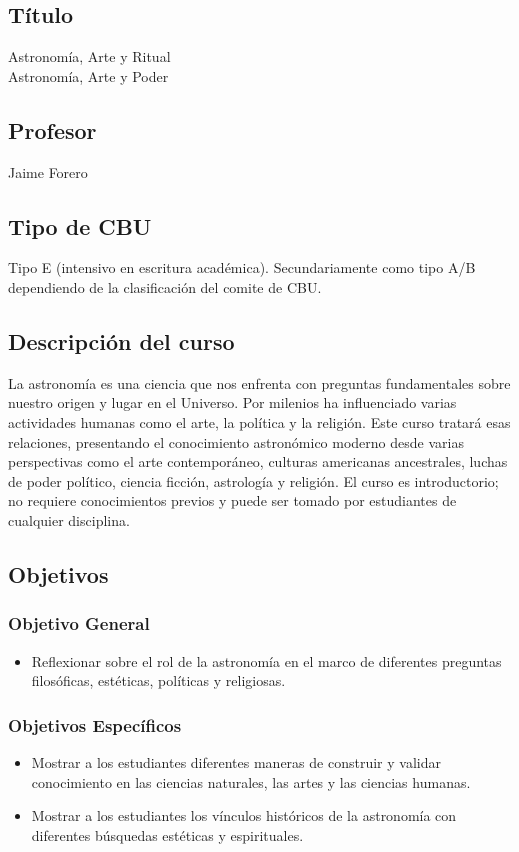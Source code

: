 \documentclass{report}
\begin{document}
\subsection*{\bf T\'itulo}
Astronom\'ia, Arte y Ritual\\
Astronom\'ia, Arte y Poder\\

\subsection*{\bf Profesor}
Jaime Forero\\

\subsection*{Tipo de CBU}
Tipo E (intensivo en escritura acad\'emica). Secundariamente como tipo
A/B dependiendo de la clasificaci\'on del comite de CBU.  

\subsection*{Descripci\'on del curso}
La astronom\'ia es una ciencia que nos enfrenta con preguntas
fundamentales sobre nuestro origen y lugar en el Universo. Por
milenios ha influenciado varias actividades humanas como el arte, la
pol\'itica y la religi\'on. Este curso tratar\'a esas relaciones,
presentando el conocimiento astron\'omico moderno desde varias
perspectivas como el arte contempor\'aneo, culturas americanas
ancestrales, luchas de poder pol\'itico, ciencia ficci\'on,
astrolog\'ia y religi\'on. El curso es introductorio; no requiere
conocimientos previos y puede ser tomado por estudiantes de cualquier
disciplina. 
\subsection*{Objetivos}

\subsubsection*{Objetivo General}
\begin{itemize}
\item Reflexionar sobre el rol de la astronom\'ia en el marco de 
  diferentes preguntas filos\'oficas, est\'eticas, pol\'iticas y
  religiosas.
\end{itemize}

\subsubsection*{Objetivos Espec\'ificos}
\begin{itemize}
\item Mostrar a los estudiantes diferentes maneras de construir
  y validar conocimiento en las ciencias naturales, las artes y las
  ciencias humanas. 
\item Mostrar a los estudiantes los v\'inculos hist\'oricos de la
  astronom\'ia con diferentes b\'usquedas est\'eticas y espirituales.  
\end{itemize}
\end{document}
